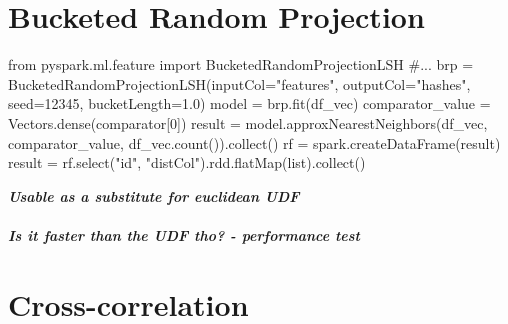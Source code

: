 \section{Bucketed Random Projection}

\begin{pythonCode}
from pyspark.ml.feature import BucketedRandomProjectionLSH
#...
brp = BucketedRandomProjectionLSH(inputCol="features", outputCol="hashes", seed=12345, bucketLength=1.0)
model = brp.fit(df_vec)
comparator_value = Vectors.dense(comparator[0])
result = model.approxNearestNeighbors(df_vec, comparator_value, df_vec.count()).collect()
rf = spark.createDataFrame(result)
result = rf.select("id", "distCol").rdd.flatMap(list).collect()
\end{pythonCode}

\noindent\textit{\textbf{Usable as a substitute for euclidean UDF\\}}
\ \\
\noindent\textit{\textbf{Is it faster than the UDF tho? - performance test\\}}

\section{Cross-correlation}

